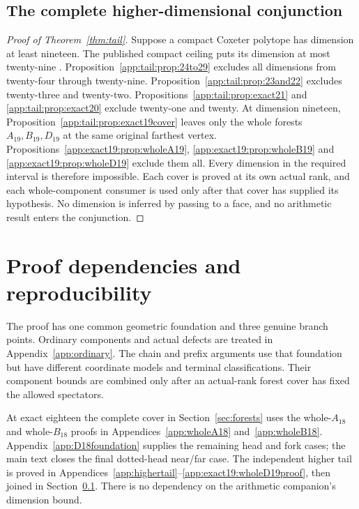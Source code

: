 \documentclass[11pt]{article}
\theoremstyle{definition}
\theoremstyle{remark}
\begin{document}
\subsection{The complete higher-dimensional conjunction}
\label{app:tail:completeconjunction}
\begin{proof}[Proof of Theorem~\ref{thm:tail}]
Suppose a compact Coxeter polytope has dimension at least nineteen.
The published compact ceiling puts its dimension at most twenty-nine
\cite{Vin84,Vin85}. Proposition~\ref{app:tail:prop:24to29} excludes
all dimensions from twenty-four through twenty-nine.
Proposition~\ref{app:tail:prop:23and22} excludes twenty-three and
twenty-two. Propositions~\ref{app:tail:prop:exact21} and
\ref{app:tail:prop:exact20} exclude twenty-one and twenty.
At dimension nineteen, Proposition~\ref{app:tail:prop:exact19cover}
leaves only the whole forests $A_{19},B_{19},D_{19}$ at the same
original farthest vertex. Propositions~\ref{app:exact19:prop:wholeA19},
\ref{app:exact19:prop:wholeB19} and
\ref{app:exact19:prop:wholeD19} exclude them all.
Every dimension in the required interval is therefore impossible.
Each cover is proved at its own actual rank, and each whole-component
consumer is used only after that cover has supplied its hypothesis.
No dimension is inferred by passing to a face, and no arithmetic
result enters the conjunction.
\end{proof}

\section{Proof dependencies and reproducibility}
\label{app:obligations}
The proof has one common geometric foundation and three genuine
branch points. Ordinary components and actual defects are treated
in Appendix~\ref{app:ordinary}. The chain and prefix arguments use
that foundation but have different coordinate models and terminal
classifications. Their component bounds are combined only after
an actual-rank forest cover has fixed the allowed spectators.

At exact eighteen the complete cover in Section~\ref{sec:forests}
uses the whole-\(A_{18}\) and whole-\(B_{18}\) proofs in
Appendices~\ref{app:wholeA18} and~\ref{app:wholeB18}.
Appendix~\ref{app:D18foundation} supplies the remaining head and
fork cases; the main text closes the final dotted-head near/far case.
The independent higher tail is proved in
Appendices~\ref{app:highertail}--\ref{app:exact19:wholeD19proof},
then joined in Section~\ref{app:tail:completeconjunction}.
There is no dependency on the arithmetic companion's dimension bound.
\end{document}
